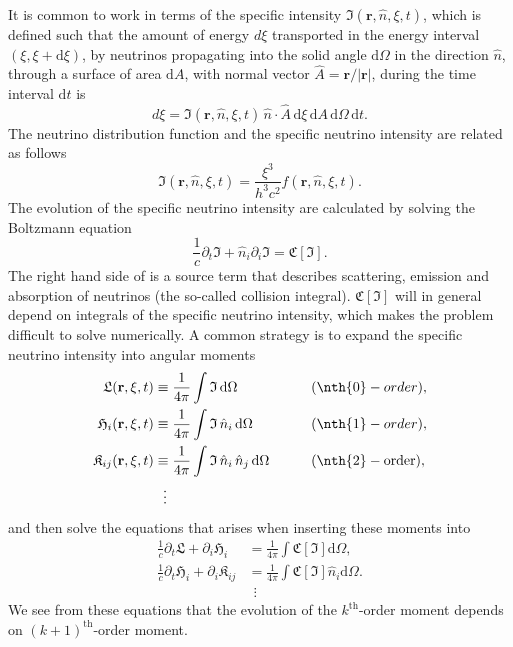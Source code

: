 It is common to work in terms of the specific intensity $\mathfrak{I}(\mathbf{r},\hat{n},\xi,t)$,
which is defined such that the amount of energy $d\xi$ transported in the energy interval
$(\xi,\xi+\mathrm{d}\xi)$, by neutrinos propagating into 
the solid angle $\mathrm{d}\Omega$ in the direction $\hat{n}$,
through a surface of area $\mathrm{d}A$, with normal vector $\hat{A} = \mathbf{r}/|\mathbf{r}|$, 
during the time interval $\mathrm{d}t$ is
\begin{equation} \label{eqN:intns}
d \xi = \mathfrak{I}(\mathbf{r},\hat{n},\xi,t) \, \hat{n} \cdot \hat{A}
\, \mathrm{d}\xi \, \mathrm{d}A \, \mathrm{d}\Omega \, \mathrm{d}t.
\end{equation}
The neutrino distribution function and the specific neutrino intensity are related as follows
\begin{equation}
\mathfrak{I}(\mathbf{r},\hat{n},\xi,t) = \frac{\xi^3}{h^3 c^2} f(\mathbf{r},\hat{n},\xi,t).
\end{equation}
The evolution of the specific neutrino intensity are calculated by solving the Boltzmann equation
\begin{equation} \label{eqN:boltz}
\frac{1}{c} \partial_t \mathfrak{I} + \hat{n}_i \partial_i \mathfrak{I} = \mathfrak{C} [\mathfrak{I}].
\end{equation}
The right hand side of  is a source term that describes scattering, emission and absorption
of neutrinos (the so-called collision integral). $\mathfrak{C} [\mathfrak{I}]$ will in general depend on integrals of the specific neutrino intensity, which makes the problem difficult to solve numerically. 
A common strategy is to expand the specific neutrino intensity into angular moments
\begin{alignat}{2}
\mathfrak{L}(\mathbf{r},\xi,t) &\equiv  \frac{1}{4\pi} \int \mathfrak{I} \, \mathrm{d} \Omega &&\qquad (\nth{0}-order), \\ 
\mathfrak{H}_i(\mathbf{r},\xi,t) &\equiv  \frac{1}{4\pi} \int \mathfrak{I} \, \hat{n}_i \, \mathrm{d} \Omega &&\qquad (\nth{1}-order), \\
\mathfrak{K}_{ij}(\mathbf{r},\xi,t) &\equiv  \frac{1}{4\pi} \int \mathfrak{I} \, \hat{n}_i \, \hat{n}_j \, \mathrm{d} \Omega &&\qquad (\nth{2}-\text{order}), \\
& \ \ \vdots && \nonumber
\end{alignat}
and then solve the equations that arises when inserting these moments into 
\begin{align}
\frac{1}{c} \partial_t \mathfrak{L} +  \partial_i \mathfrak{H}_i &= \frac{1}{4\pi} \int \mathfrak{C} [\mathfrak{I}] \mathrm{d} \Omega, \\
\frac{1}{c} \partial_t \mathfrak{H}_i + \partial_i \mathfrak{K}_{ij} &= \frac{1}{4\pi} \int \mathfrak{C} [\mathfrak{I}] \hat{n}_i \mathrm{d} \Omega. \\
& \ \ \vdots \nonumber
\end{align}
We see from these equations that the evolution of the $k^{\text{th}}$-order moment depends on $(k+1)^{\text{th}}$-order moment.

